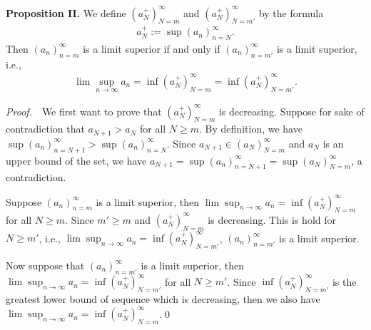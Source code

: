 \documentclass{book}
\newcommand{\pff}{\vspace{.25em}\noindent\emph{Proof.}~~}
\newcommand{\titl}[1]{\noindent\textbf{#1}}
\begin{document}
\begin{framed}
\titl{Proposition I\!I.} We define $(a_N^+)_{N=m}^\infty$ and $(a_N^+)_{N=m'}^\infty$ by the formula
    \begin{align*}
        a_N^+:=\sup(a_n)_{n=N}^\infty.
    \end{align*}
Then $(a_n)_{n=m}^\infty$ is a limit superior if and only if $(a_n)_{n=m'}^\infty$ is a limit superior, i.e.,
    \begin{align*}
        \lim\sup_{n\to\infty}a_n=\inf(a_N^+)_{N=m}^\infty=\inf(a_N^+)_{N=m'}^\infty.
    \end{align*}
\end{framed}

\pff We first want to prove that $(a_N^+)_{N=m}^\infty$ is decreasing. Suppose for sake of contradiction that $a_{N+1}> a_N$ for all $N\geq m$. By definition, we have $\sup(a_n)_{n=N+1}^\infty>\sup(a_n)_{n=N}^\infty$. Since $a_{N+1}\in(a_N)_{N=m}^\infty$ and $a_N$ is an upper bound of the set, we have $a_{N+1}=\sup(a_n)_{n=N+1}^\infty=\sup(a_N)_{N=m}^\infty$, a contradiction.

Suppose $(a_n)_{n=m}^\infty$ is a limit superior, then $\lim\sup_{n\to\infty}a_n=\inf(a_N^+)_{N=m}^\infty$ for all $N\geq m$. Since $m'\geq m$ and $(a_N^+)_{N=m}^\infty$ is decreasing. This is hold for $N\geq m'$, i.e., $\lim\sup_{n\to\infty}a_n=\inf(a_N^+)_{N=m'}^\infty$, $(a_n)_{n=m'}^\infty$ is a limit superior.

Now suppose that $(a_n)_{n=m'}^\infty$ is a limit superior, then $\lim\sup_{n\to\infty}a_n=\inf(a_N^+)_{N=m'}^\infty$ for all $N\geq m'$. Since $\inf(a_N^+)_{N=m'}^\infty$ is the greatest lower bound of sequence which is decreasing, then we also have $\lim\sup_{n\to\infty}a_n=\inf(a_N^+)_{N=m}^\infty$.\qed
\begin{comment}
Suppose that $(a_n)_{n=m}^\infty$ is a limit superior, then $\lim\sup_{n\to\infty}a_n=\inf(a_N^+)_{N=m}^\infty$. Since $m'\geq m$, we have $a_m^+\geq a_{m'}^+$ for all $N\geq m$. Then we have $\lim\sup_{n\to\infty}a_n=\inf(a_N^+)_{N=m'}^\infty$. Otherwise, we have $a_N^+=a_N^+=+\infty$ for all $N\geq m$, and $\lim\sup_{n\to\infty}a_n=+\infty$. Thus $(a_n)_{n=m'}^\infty$ is a limit superior.

Now we suppose that $(a_n)_{n=m'}^\infty$ is a limit superior. We know that $a_m^+\geq a_{m'}^+$ for every $N\geq m$. So that
    \begin{align*}
        \lim\sup_{n\to\infty}a_n=\inf(a_N^+)_{N=m}^\infty.
    \end{align*}
$(a_n)_{n=m}^\infty$ is a limit superior.\qed
\end{comment}
\end{document}
